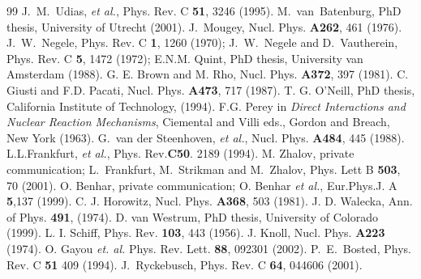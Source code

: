 \documentclass[aps,prl,twocolumn,showpacs,amsmath,amssymb,floats]{revtex4}
\begin{document}
\begin{thebibliography}{99}
J.~M.~Udias, {\it et al.}, Phys. Rev. C {\bf 51}, 3246 (1995).
M.~van~Batenburg, PhD thesis, University of Utrecht (2001).
J.~Mougey, Nucl. Phys. {\bf A262}, 461 (1976).
J.~W.~Negele, Phys. Rev. C {\bf 1}, 1260 (1970); J.~W.~Negele and D.~Vautherein, Phys. Rev. C {\bf 5}, 1472 (1972); E.N.M. Quint, PhD thesis, University van Amsterdam (1988).
 G. E. Brown and M. Rho, Nucl. Phys. {\bf A372}, 397 (1981).
 C. Giusti and F.D. Pacati, Nucl. Phys. {\bf A473}, 717 
(1987).
 T. G. O'Neill, PhD thesis, California Institute of Technology, 
(1994).
 F.G. Perey in {\sl Direct Interactions and Nuclear Reaction 
Mechanisms},
Ciemental and Villi eds., Gordon and Breach, New York (1963). 
G.~van der Steenhoven, {\it et al.}, Nucl. Phys. {\bf A484}, 
445 (1988).
 L.L.Frankfurt, {\sl et al.}, Phys. Rev.{\bf C50}. 2189 (1994). 
 M. Zhalov, private communication; L.~Frankfurt, M.~Strikman and M.~Zhalov, Phys. Lett B {\bf 503}, 70 (2001).
 O. Benhar, private communication; O. Benhar {\it et al.}, Eur.Phys.J. A {\bf 5},137 (1999).   
 C. J. Horowitz, Nucl. Phys. {\bf A368}, 503 (1981).
 J. D. Walecka, Ann. of Phys. {\bf 491}, (1974). 
 D. van Westrum, PhD thesis, University of Colorado (1999).
 L. I. Schiff, Phys. Rev. {\bf 103}, 443 (1956).
 J. Knoll, Nucl. Phys. {\bf A223} (1974).
O. Gayou {\sl et. al.} Phys. Rev. Lett.  {\bf 88}, 092301
(2002).
P.~E.~Bosted, Phys. Rev. C {\bf 51} 409 (1994).
J.~Ryckebusch, Phys. Rev. C {\bf 64}, 044606 (2001). 
\end{thebibliography}
\end{document}
